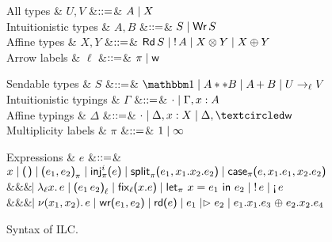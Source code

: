 \begin{figure*}[t]
  \centering
  \begin{minipage}{.475\textwidth}
    \centering
    \begin{grammar}
        All types
      & $U, V$
        &$\mathrel{::=}$& $A \mathrel{\mid} X$
      \\      
      Intuitionistic types
      & $A,B$
      &$\mathrel{::=}$& $S \mathrel{\mid} \text{\textsf{Wr}}\,S$
      \\
      Affine types
      & $X,Y$
      &$\mathrel{::=}$& $\text{\textsf{Rd}}\,S \mathrel{\mid} {!}\,{A} \mathrel{\mid}
      {X}\otimes{Y} \mathrel{\mid} {X}\oplus{Y}$
      \\
      Arrow labels
      & $\ell$
      &$\mathrel{::=}$& $\pi \mathrel{\mid} \textsf{w}$
    \end{grammar}
  \end{minipage}%
  \begin{minipage}{.475\textwidth}
    \centering
    \begin{grammar}
      Sendable types
      & $S$
      &$\mathrel{::=}$& $\tyUnit \bnfalt A ** B \bnfalt \tySum{A}{}{B} \bnfalt \tyArr{U}{\ell}{V}$              
      \\
      Intuitionistic typings
      & $\Gamma$
      &$\mathrel{::=}$& $\cdot \mathrel{\mid} \Gamma,x:A$
      \\
      Affine typings
      & $\Delta$
      &$\mathrel{::=}$& $\emptyctxt \bnfalt \Delta,x:X \bnfalt \Delta, \wrtok$
      \\            
      Multiplicity labels
      & $\pi$
      &$\mathrel{::=}$& $1 \mathrel{\mid} \infty$
    \end{grammar}
  \end{minipage}
  \begin{grammar}
    Expressions
    & $e$
    &$\mathrel{::=}$&
    $\eVar{x} \bnfalt \eUnit \bnfalt \ePair{e_1}{e_2}{\pi} \bnfalt \eInj{i}{e}
    \bnfalt \eSplit{e_1}{x_1}{x_2}{e_2} \bnfalt
    \eCase{\pi}{e}{x_1}{e_1}{x_2}{e_2}$
    \\ &&& $\hspace{-1.02ex}\mathrel{\mid} \lambda_{\ell} {x}.\,{e} \mathrel{\mid} \textsf{(} e_1\,e_2\textsf{)}_{\ell} \mathrel{\mid} \text{\textsf{fix}}_{\ell}\textsf{(}{x}.{e}\textsf{)}
    \mathrel{\mid} \text{\textsf{let}}_{\pi}\ {x} = {e_1}\ \text{\textsf{in}}\ {e_2} \mathrel{\mid} {!}\,{e} \mathrel{\mid} \textnormal{!`}\,{e}$
    \\ &&& $\hspace{-1.02ex}\mathrel{\mid} \nu(x_1,x_2).\,e \mathrel{\mid} \text{\textsf{wr}}\textsf{(}{e_1},{e_2}\textsf{)}
    \mathrel{\mid} \text{\textsf{rd}}\textsf{(}{e}\textsf{)} \mathrel{\mid} e_1 \mathrel{|\rhd} e_2 \mathrel{\mid} {e_1}.{x_1}.{e_3} \mathrel{\oplus} {e_2}.{x_2}.{e_4}$
  \end{grammar}      
  \caption{Syntax of ILC.}
  \label{fig:ilc-syntax}
\end{figure*}
